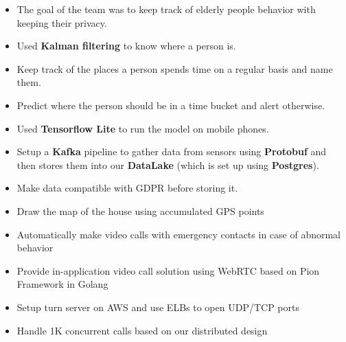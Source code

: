 \begin{itemize}
  \item The goal of the team was to keep track of elderly people behavior with keeping their privacy.
  \item Used \textbf{Kalman filtering} to know where a person is.
  \item Keep track of the places a person spends time on a regular basis and name them.
  \item Predict where the person should be in a time bucket and alert otherwise.
  \item Used \textbf{Tensorflow Lite} to run the model on mobile phones.
  \item Setup a \textbf{Kafka} pipeline to gather data from sensors using \textbf{Protobuf} and then stores them into our \textbf{DataLake} (which is set up using \textbf{Postgres}).
  \item Make data compatible with GDPR before storing it.
  \item Draw the map of the house using accumulated GPS points
  \item Automatically make video calls with emergency contacts in case of abnormal behavior
  \item Provide in-application video call solution using WebRTC based on Pion Framework in Golang
  \item Setup turn server on AWS and use ELBs to open UDP/TCP ports
  \item Handle 1K concurrent calls based on our distributed design
\end{itemize}
